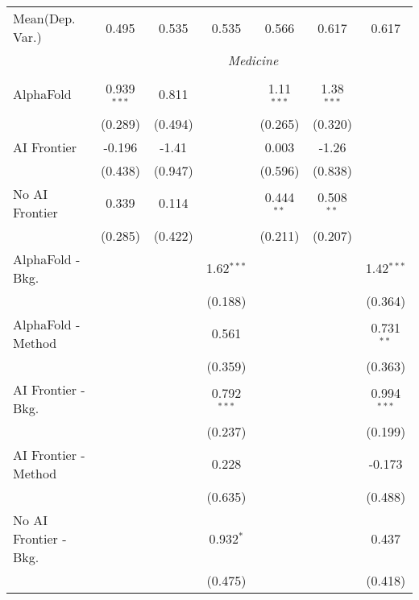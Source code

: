 \begin{tabular}{lcccccc}
Mean(Dep. Var.) & 0.495 & 0.535 & 0.535 & 0.566 & 0.617 & 0.617 \\
 & \multicolumn{6}{c}{\textit{Medicine}} \\ \\
   AlphaFold               & 0.939$^{***}$ & 0.811   &               & 1.11$^{***}$ & 1.38$^{***}$ &   \\   
                           & (0.289)       & (0.494) &               & (0.265)      & (0.320)      &   \\   
   AI Frontier             & -0.196        & -1.41   &               & 0.003        & -1.26        &   \\   
                           & (0.438)       & (0.947) &               & (0.596)      & (0.838)      &   \\   
   No AI Frontier          & 0.339         & 0.114   &               & 0.444$^{**}$ & 0.508$^{**}$ &   \\   
                           & (0.285)       & (0.422) &               & (0.211)      & (0.207)      &   \\   
   AlphaFold - Bkg.        &               &         & 1.62$^{***}$  &              &              & 1.42$^{***}$\\   
                           &               &         & (0.188)       &              &              & (0.364)\\   
   AlphaFold - Method      &               &         & 0.561         &              &              & 0.731$^{**}$\\   
                           &               &         & (0.359)       &              &              & (0.363)\\   
   AI Frontier - Bkg.      &               &         & 0.792$^{***}$ &              &              & 0.994$^{***}$\\   
                           &               &         & (0.237)       &              &              & (0.199)\\   
   AI Frontier - Method    &               &         & 0.228         &              &              & -0.173\\   
                           &               &         & (0.635)       &              &              & (0.488)\\   
   No AI Frontier - Bkg.   &               &         & 0.932$^{*}$   &              &              & 0.437\\   
                           &               &         & (0.475)       &              &              & (0.418)\\   

\end{tabular}
